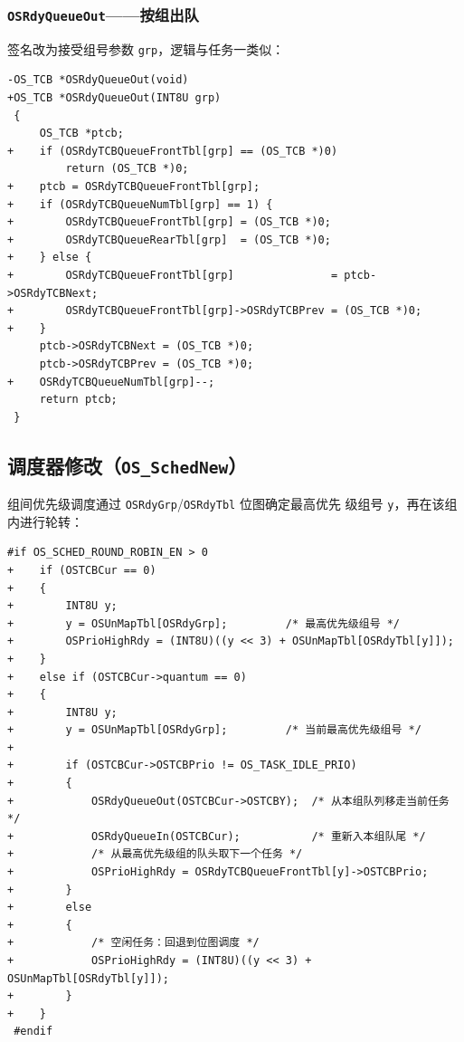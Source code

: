 \documentclass[12pt,a4paper]{article}
\begin{document}
\subsubsection{\texttt{OSRdyQueueOut}——按组出队}

签名改为接受组号参数 \texttt{grp}，逻辑与任务一类似：

\begin{lstlisting}[style=diffstyle,caption={os\_core.c — 按组出队（签名变更）}]
-OS_TCB *OSRdyQueueOut(void)
+OS_TCB *OSRdyQueueOut(INT8U grp)
 {
     OS_TCB *ptcb;
+    if (OSRdyTCBQueueFrontTbl[grp] == (OS_TCB *)0)
         return (OS_TCB *)0;
+    ptcb = OSRdyTCBQueueFrontTbl[grp];
+    if (OSRdyTCBQueueNumTbl[grp] == 1) {
+        OSRdyTCBQueueFrontTbl[grp] = (OS_TCB *)0;
+        OSRdyTCBQueueRearTbl[grp]  = (OS_TCB *)0;
+    } else {
+        OSRdyTCBQueueFrontTbl[grp]               = ptcb->OSRdyTCBNext;
+        OSRdyTCBQueueFrontTbl[grp]->OSRdyTCBPrev = (OS_TCB *)0;
+    }
     ptcb->OSRdyTCBNext = (OS_TCB *)0;
     ptcb->OSRdyTCBPrev = (OS_TCB *)0;
+    OSRdyTCBQueueNumTbl[grp]--;
     return ptcb;
 }
\end{lstlisting}

\subsection{调度器修改（\texttt{OS\_SchedNew}）}

组间优先级调度通过 \texttt{OSRdyGrp}/\texttt{OSRdyTbl} 位图确定最高优先
级组号 \texttt{y}，再在该组内进行轮转：

\begin{lstlisting}[style=diffstyle,caption={os\_core.c — 分组轮转调度逻辑}]
 #if OS_SCHED_ROUND_ROBIN_EN > 0
+    if (OSTCBCur == 0)
+    {
+        INT8U y;
+        y = OSUnMapTbl[OSRdyGrp];         /* 最高优先级组号 */
+        OSPrioHighRdy = (INT8U)((y << 3) + OSUnMapTbl[OSRdyTbl[y]]);
+    }
+    else if (OSTCBCur->quantum == 0)
+    {
+        INT8U y;
+        y = OSUnMapTbl[OSRdyGrp];         /* 当前最高优先级组号 */
+
+        if (OSTCBCur->OSTCBPrio != OS_TASK_IDLE_PRIO)
+        {
+            OSRdyQueueOut(OSTCBCur->OSTCBY);  /* 从本组队列移走当前任务 */
+            OSRdyQueueIn(OSTCBCur);           /* 重新入本组队尾 */
+            /* 从最高优先级组的队头取下一个任务 */
+            OSPrioHighRdy = OSRdyTCBQueueFrontTbl[y]->OSTCBPrio;
+        }
+        else
+        {
+            /* 空闲任务：回退到位图调度 */
+            OSPrioHighRdy = (INT8U)((y << 3) + OSUnMapTbl[OSRdyTbl[y]]);
+        }
+    }
 #endif
\end{lstlisting}
\end{document}
